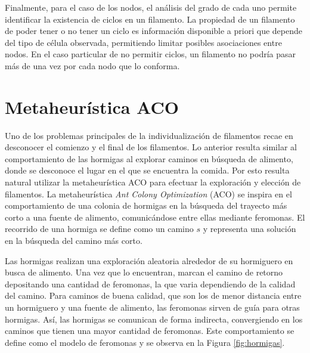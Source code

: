 Finalmente, para el caso de los nodos, el an\'alisis del grado de cada uno permite identificar la existencia de ciclos \citep[ver][]{wilson1979introduction} en un filamento. La propiedad de un filamento de poder tener o no tener un ciclo es informaci\'on disponible a priori que depende del tipo de c\'elula observada, permitiendo limitar posibles asociaciones entre nodos. En el caso particular de no permitir ciclos, un filamento no podr\'ia pasar m\'as de una vez por cada nodo que lo conforma. 

\section{Metaheur\'istica ACO}
\label{sec:hormigas}

Uno de los problemas principales de la individualizaci\'on de filamentos recae en desconocer el comienzo y el final de los filamentos. Lo anterior resulta similar al comportamiento de las hormigas al explorar caminos en b\'usqueda de alimento, donde se desconoce el lugar en el que se encuentra la comida. Por esto resulta natural utilizar la metaheur\'istica ACO para efectuar la exploraci\'on y elecci\'on de filamentos. La metaheur\'istica {\it Ant Colony Optimization} (ACO) se inspira en el comportamiento de una colonia de hormigas en la b\'usqueda del trayecto m\'as corto a una fuente de alimento, comunic\'andose entre ellas mediante feromonas. El recorrido de una hormiga se define como un camino $s$ y representa una soluci\'on en la b\'usqueda del camino m\'as corto.

Las hormigas realizan una exploraci\'on aleatoria alrededor de su hormiguero en busca de alimento. Una vez que lo encuentran, marcan el camino de retorno depositando una cantidad de feromonas, la que varia dependiendo de la calidad del camino. Para caminos de buena calidad, que son los de menor distancia entre un hormiguero y una fuente de alimento, las feromonas sirven de guía para otras hormigas. As\'i, las hormigas se comunican de forma indirecta, convergiendo en los caminos que tienen una mayor cantidad de feromonas. Este comportamiento se define como el modelo de feromonas y se observa en la Figura \ref{fig:hormigas}.


